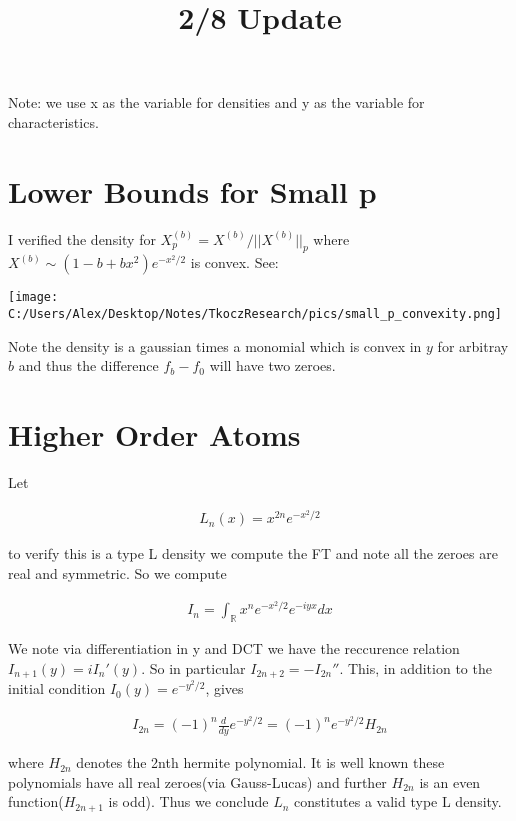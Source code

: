 \documentclass[11pt]{article}
\title{2/8 Update}
\newcommand{\R}{\mathbb{R}}
\theoremstyle{remark}
\begin{document}
\maketitle

Note: we use x as the variable for densities and y as the variable for characteristics.

\section{Lower Bounds for Small p}

I verified the density for $X^{(b)}_p = X^{(b)}/||X^{(b)}||_p$ where $X^{(b)} \sim (1-b+bx^2)e^{-x^2/2}$ is convex. See:

\texttt{[image: C:/Users/Alex/Desktop/Notes/TkoczResearch/pics/small\_p\_convexity.png]}

Note the density is a gaussian times a monomial which is convex in $y$ for arbitray $b$ and thus the difference  $f_b-f_0$ will have two zeroes.


\section{Higher Order Atoms}

Let 

\begin{align*}
	L_n(x) = x^{2n} e^{-x^2/2}
\end{align*}

to verify this is a type L density we compute the FT and note all the zeroes are real and symmetric. So we compute

\begin{align*}
	I_n = \int_{\R} x^n e^{-x^2/2}e^{-iyx}dx
\end{align*}

We note via differentiation in y and DCT we have the reccurence relation $I_{n+1}(y) = iI_n'(y)$. So in particular $I_{2n+2} = - I_{2n}''$. This, in addition to the initial condition $I_0(y) = e^{-y^2/2}$, gives

\begin{align*}
	I_{2n} = (-1)^n \frac{d}{dy}e^{-y^2/2} = (-1)^ne^{-y^2/2}H_{2n}
\end{align*}

where $H_{2n}$ denotes the 2nth hermite polynomial. It is well known these polynomials have all real zeroes(via Gauss-Lucas) and further $H_{2n}$ is an even function($H_{2n+1}$ is odd). Thus we conclude $L_n$ constitutes a valid type L density.
\end{document}
